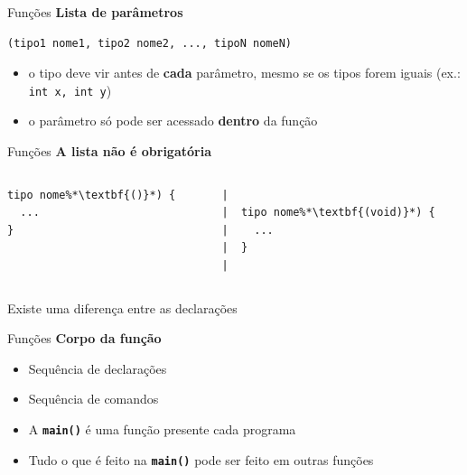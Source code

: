 \documentclass[10pt]{beamer}
\begin{document}
\begin{frame}[fragile]{Funções}
  \huge
  \textbf{Lista de parâmetros}
  \vfill
  \large
  \begin{verbatim}
(tipo1 nome1, tipo2 nome2, ..., tipoN nomeN)
  \end{verbatim}
  \vfill
  \setlength{\leftmargini}{0pt}
  \begin{itemize}
      \item [] o tipo deve vir antes de \textbf{cada} parâmetro, mesmo se os tipos forem iguais (ex.: \texttt{int x, int y})
      \item [] o parâmetro só pode ser acessado \textbf{dentro} da função
  \end{itemize}
\end{frame}

\begin{frame}[fragile]{Funções}
  \huge
  \textbf{A lista \alert{não é obrigatória}}
  \vfill
  \Large
  \begin{columns}
    \begin{column}{0.35\textwidth}
      \begin{lstlisting}
tipo nome%*\textbf{()}*) {
  ...
}
      \end{lstlisting}
    \end{column}
    \begin{column}{0.60\textwidth}
      \begin{lstlisting}
|
|  tipo nome%*\textbf{(void)}*) {
|    ...
|  }
|
      \end{lstlisting}
    \end{column}
  \end{columns}
  \vfill
  \large
  Existe uma diferença entre as declarações
\end{frame}

\begin{frame}{Funções}
  \huge
  \textbf{Corpo da função}
  \vfill
  \LARGE
  \begin{itemize}
    \item Sequência de declarações
    \item Sequência de comandos
  \end{itemize}
  \vfill
  \large
  \setlength{\leftmargini}{0pt}
  \begin{itemize}
      \item [] A \textbf{\texttt{main()}} é uma função presente cada programa
      \item [] Tudo o que é feito na \textbf{\texttt{main()}} pode ser feito em outras funções
  \end{itemize}
\end{frame}
\end{document}
